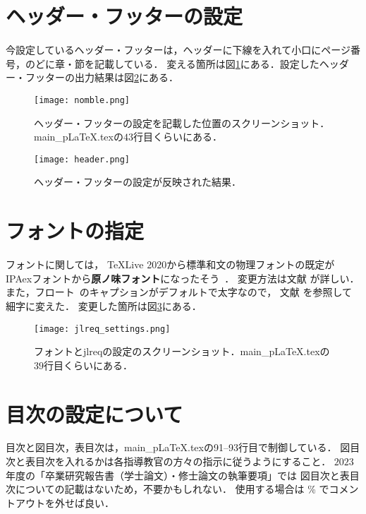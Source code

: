 \section{ヘッダー・フッターの設定}
今設定しているヘッダー・フッターは，ヘッダーに下線を入れて小口にページ番号，のどに章・節を記載している．
変える箇所は図\ref{fig:nomble}にある．設定したヘッダー・フッターの出力結果は図\ref{fig:header}にある．

\begin{figure}[h]
  \centering
  \texttt{[image: nomble.png]}
  \caption{ヘッダー・フッターの設定を記載した位置のスクリーンショット．main\_pLaTeX.texの$43$行目くらいにある．}
  \label{fig:nomble}
\end{figure}
\begin{figure}[h]
  \centering
  \texttt{[image: header.png]}
  \caption{ヘッダー・フッターの設定が反映された結果．}
  \label{fig:header}
\end{figure}


\section{フォントの指定}
フォントに関しては，
\TeX Live 2020から標準和文の物理フォントの既定が
IPAexフォントから\textbf{\textsf{原ノ味フォント}}になったそう~\cite{font}．
変更方法は文献 \cite{font} が詳しい．
また，フロート~\cite{float}のキャプションがデフォルトで太字なので，
文献 \cite{jlreq} を参照して細字に変えた．
変更した箇所は図\ref{fig:jlreqset}にある．

\begin{figure}[h]
  \centering
  \texttt{[image: jlreq\_settings.png]}
  \caption{フォントとjlreqの設定のスクリーンショット．main\_pLaTeX.texの$39$行目くらいにある．}
  \label{fig:jlreqset}
\end{figure}


\section{目次の設定について}
目次と図目次，表目次は，main\_pLaTeX.texの91--93行目で制御している．
図目次と表目次を入れるかは各指導教官の方々の指示に従うようにすること．
$2023$年度の「卒業研究報告書（学士論文）・修士論文の執筆要項」では
図目次と表目次についての記載はないため，不要かもしれない．
使用する場合は \% でコメントアウトを外せば良い．

